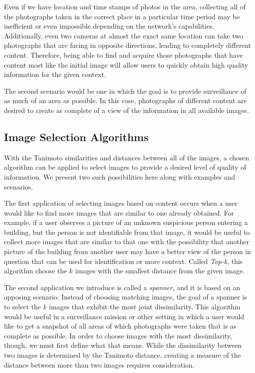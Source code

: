 Even if we have location and time stamps of photos in the area, collecting all of the photographs taken in the correct place in a particular time period may be inefficient or even impossible depending on the network's capabilities. Additionally, even two cameras at almost the exact same location can take two photographs that are facing in opposite directions, leading to completely different content.  Therefore, being able to find and acquire those photographs that have content most like the initial image will allow users to quickly obtain high quality information for the given context.

The second scenario would be one in which the goal is to provide surveillance of as much of an area as possible.  In this case, photographs of different content are desired to create as complete of a view of the information in all available images.  

\subsection{Image Selection Algorithms}

With the Tanimoto similarities and distances between all of the images, a chosen algorithm can be applied to select images to provide a desired level of quality of information.  We present two such possibilities here along with examples and scenarios.

The first application of selecting images based on content occurs when a user would like to find more images that are similar to one already obtained.  For example, if a user observes a picture of an unknown suspicious person entering a building, but the person is not identifiable from that image, it would be useful to collect more images that are similar to that one with the possibility that another picture of the building from another user may have a better view of the person in question that can be used for identification or more context.  Called \emph{Top-k}, this algorithm choose the $k$ images with the smallest distance from the given image.  

The second application we introduce is called a \emph{spanner}, and it is based on an opposing scenario.  Instead of  choosing matching images, the goal of a spanner is to select the $k$ images that exhibit the most joint dissimilarity.  This algorithm would be useful in a surveillance mission or other setting in which a user would like to get a snapshot of all areas of which photographs were taken that is as complete as possible.  In order to choose images with the most dissimilarity, though, we must first define what that means.  While the dissimilarity between two images is determined by the Tanimoto distance, creating a measure of the distance between more than two images requires consideration.  

